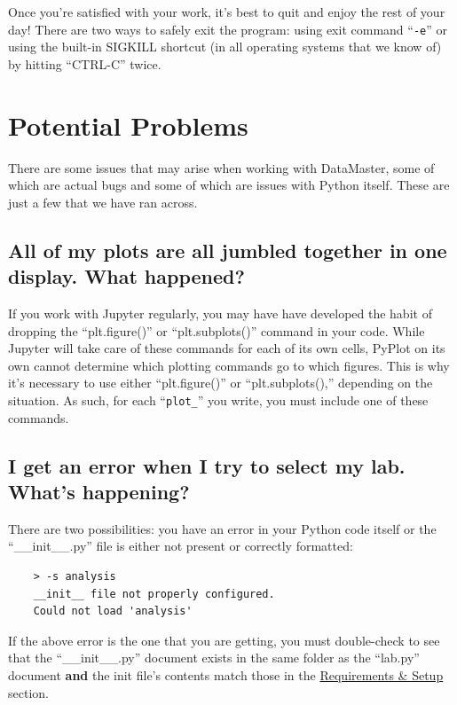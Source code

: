 \documentclass[12pt]{article}
\begin{document}
{Once you're satisfied with your work, it's best to quit and enjoy the rest of your day! There are two ways to safely exit the program: using exit command ``\texttt{-e}'' or using the built-in SIGKILL shortcut (in all operating systems that we know of) by hitting ``CTRL-C'' twice.

\section*{Potential Problems}
\label{sec:potprob}

There are some issues that may arise when working with DataMaster, some of which are actual bugs and some of which are issues with Python itself. These are just a few that we have ran across.

\subsection*{All of my plots are all jumbled together in one display. What happened?}

If you work with Jupyter regularly, you may have have developed the habit of dropping the ``plt.figure()'' or ``plt.subplots()'' command in your code. While Jupyter will take care of these commands for each of its own cells, PyPlot on its own cannot determine which plotting commands go to which figures. This is why it's necessary to use either ``plt.figure()'' or ``plt.subplots(),'' depending on the situation. As such, for each ``\texttt{plot\_}'' you write, you must include one of these commands.

\subsection*{I get an error when I try to select my lab. What's happening?}

There are two possibilities: you have an error in your Python code itself or the ``\_\_init\_\_.py'' file is either not present or correctly formatted:
\begin{framed}
  \begin{lstlisting}
    > -s analysis
    __init__ file not properly configured.
    Could not load 'analysis'
  \end{lstlisting}
\end{framed}
If the above error is the one that you are getting, you must double-check to see that the ``\_\_init\_\_.py'' document exists in the same folder as the ``lab.py'' document \textbf{and} the init file's contents match those in the \hyperref[sec:reqs]{Requirements \& Setup} section.

}
\end{document}
